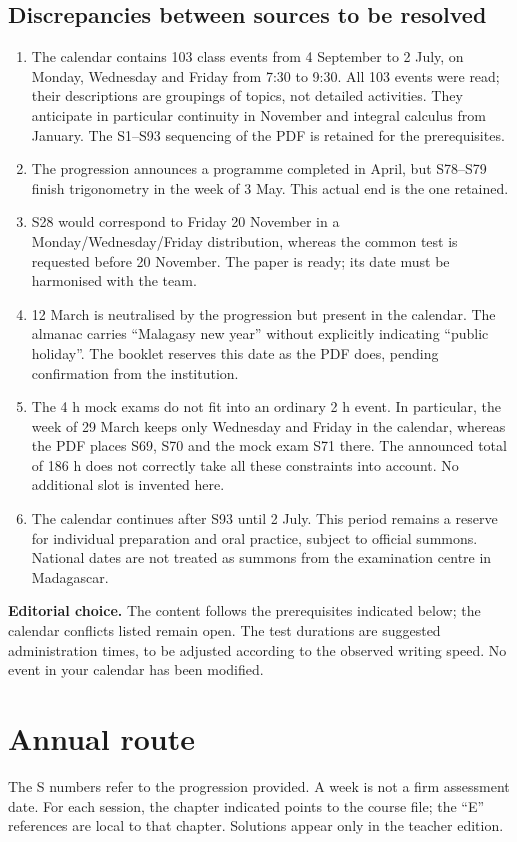 \section{Discrepancies between sources to be resolved}
\begin{enumerate}
\item The calendar contains 103 class events from 4 September to 2 July, on Monday, Wednesday and Friday from 7:30 to 9:30. All 103 events were read; their descriptions are groupings of topics, not detailed activities. They anticipate in particular continuity in November and integral calculus from January. The S1--S93 sequencing of the PDF is retained for the prerequisites.
\item The progression announces a programme completed in April, but S78--S79 finish trigonometry in the week of 3 May. This actual end is the one retained.
\item S28 would correspond to Friday 20 November in a Monday/Wednesday/Friday distribution, whereas the common test is requested before 20 November. The paper is ready; its date must be harmonised with the team.
\item 12 March is neutralised by the progression but present in the calendar. The almanac carries ``Malagasy new year'' without explicitly indicating ``public holiday''. The booklet reserves this date as the PDF does, pending confirmation from the institution.
\item The 4 h mock exams do not fit into an ordinary 2 h event. In particular, the week of 29 March keeps only Wednesday and Friday in the calendar, whereas the PDF places S69, S70 and the mock exam S71 there. The announced total of 186 h does not correctly take all these constraints into account. No additional slot is invented here.
\item The calendar continues after S93 until 2 July. This period remains a reserve for individual preparation and oral practice, subject to official summons. National dates are not treated as summons from the examination centre in Madagascar.
\end{enumerate}
\textbf{Editorial choice.} The content follows the prerequisites indicated below; the calendar conflicts listed remain open. The test durations are suggested administration times, to be adjusted according to the observed writing speed. No event in your calendar has been modified.
\fi
\tableofcontents
\clearpage
\chapter*{Annual route}
The S numbers refer to the progression provided. A week is not a firm assessment date. For each session, the chapter indicated points to the course file; the ``E'' references are local to that chapter. Solutions appear only in the teacher edition.


